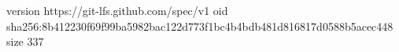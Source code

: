 version https://git-lfs.github.com/spec/v1
oid sha256:8b412230f69f99ba5982bac122d773f1bc4b4bdb481d816817d0588b5acec448
size 337

